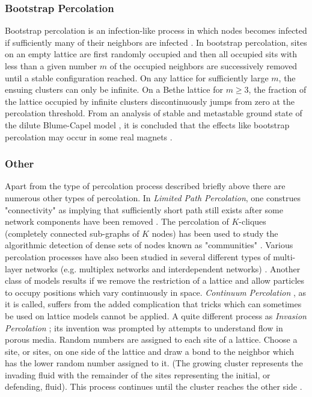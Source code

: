 		\subsubsection{Bootstrap Percolation}
		Bootstrap percolation is an infection-like process in which nodes becomes infected if sufficiently many of their neighbors are infected \cite{Adler1991}. In bootstrap percolation, sites on an empty lattice are first randomly occupied and then all occupied sits with less than a given number $m$ of the occupied neighbors are successively removed until a stable configuration reached. On any lattice for sufficiently large $m$, the ensuing clusters can  only be infinite. On a Bethe lattice for $m\geq 3$, the fraction of the lattice occupied by infinite clusters discontinuously jumps from zero at the percolation threshold. From an analysis of stable and metastable ground state of the dilute Blume-Capel model \cite{Blume1966}, it is concluded that the effects like bootstrap percolation may occur in some real magnets \cite{Chalupa1979}.


		\subsubsection{Other}
		Apart from the type of percolation process described briefly above there are numerous other types of percolation. In \textit{Limited Path Percolation}, one construes "connectivity" as implying that sufficiently short path still exists after some network components have been removed \cite{Lpez2007}. The percolation of $K$-cliques (completely connected sub-graphs of $K$ nodes) has been used to study the algorithmic detection of dense sets of nodes known as "communities" \cite{Palla2005}. Various percolation processes have also been studied in several different types of multi-layer networks (e.g. multiplex networks and interdependent networks) \cite{Boccaletti2014, Kivela2014}. Another class of models results if we remove the restriction of a lattice and allow particles to occupy positions which vary continuously in space. \textit{Continuum Percolation} \cite{Hall1985,Penrose1998,Bogu2009}, as it is called, suffers from the added complication that tricks which can sometimes be used on lattice models cannot be applied. A quite different process as \textit{Invasion Percolation} \cite{Furuberg1996,Mloy1992, Wilkinson1983}; its invention was prompted by attempts to understand flow in porous media. Random numbers are assigned to each site of a lattice. Choose a site, or sites, on one side of the lattice and draw a bond to the neighbor which has the lower random number assigned to it. (The growing cluster represents the invading fluid with the remainder of the sites representing the initial, or defending, fluid). This process continues until the cluster reaches the other side \cite{Lenormand1985}.



